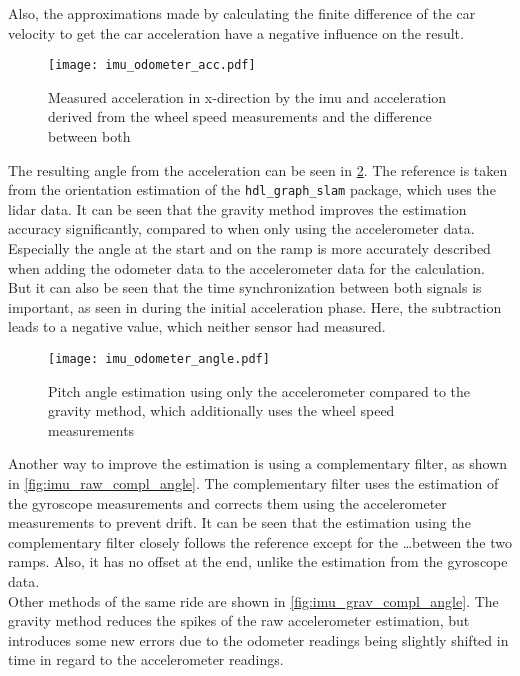 Also, the approximations made by calculating the finite difference of the car velocity to get the car acceleration have a negative influence on the result.
\begin{figure}[htbp]
    \centering
    \texttt{[image: imu\_odometer\_acc.pdf]}
    \caption[Acceleration from \gls{imu} and odometer]{Measured acceleration in x-direction by the \gls{imu} and acceleration derived from the wheel speed measurements and the difference between both}
    \label{fig:imu_odometer_acc}
\end{figure}
The resulting angle from the acceleration can be seen in \cref{fig:imu_odometer_angle}.
The reference is taken from the orientation estimation of the \texttt{hdl\_graph\_slam} package, which uses the \gls{lidar} data.
It can be seen that the gravity method improves the estimation accuracy significantly, compared to when only using the accelerometer data.
Especially the angle at the start and on the ramp is more accurately described when adding the odometer data to the accelerometer data for the calculation.
But it can also be seen that the time synchronization between both signals is important, as seen in during the initial acceleration phase.
Here, the subtraction leads to a negative value, which neither sensor had measured.\\
\begin{figure}[htbp]
    \centering
    \texttt{[image: imu\_odometer\_angle.pdf]}
    \caption[Gravity method]{Pitch angle estimation using only the accelerometer compared to the gravity method, which additionally uses the wheel speed measurements}
    \label{fig:imu_odometer_angle}
\end{figure}
Another way to improve the estimation is using a complementary filter, as shown in \cref{fig:imu_raw_compl_angle}.
The complementary filter uses the estimation of the gyroscope measurements and corrects them using the accelerometer measurements to prevent drift.
It can be seen that the estimation using the complementary filter closely follows the reference except for the \dots between the two ramps.
Also, it has no offset at the end, unlike the estimation from the gyroscope data.\\
Other methods of the same ride are shown in \cref{fig:imu_grav_compl_angle}.
The gravity method reduces the spikes of the raw accelerometer estimation, but introduces some new errors due to the odometer readings being slightly shifted in time in regard to the accelerometer readings.
